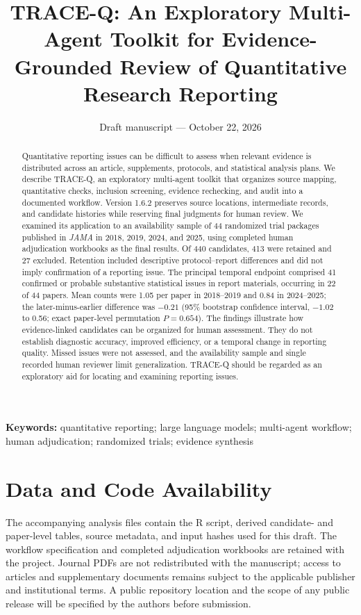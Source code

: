 \documentclass[11pt,a4paper]{article}
\title{\textbf{TRACE-Q: An Exploratory Multi-Agent Toolkit for Evidence-Grounded Review of Quantitative Research Reporting}}
\author{}
\date{Draft manuscript --- October 22, 2026}
\begin{document}
\maketitle
\begin{abstract}
Quantitative reporting issues can be difficult to assess when relevant evidence is distributed across an article, supplements, protocols, and statistical analysis plans. We describe TRACE-Q, an exploratory multi-agent toolkit that organizes source mapping, quantitative checks, inclusion screening, evidence rechecking, and audit into a documented workflow. Version 1.6.2 preserves source locations, intermediate records, and candidate histories while reserving final judgments for human review. We examined its application to an availability sample of 44 randomized trial packages published in \textit{JAMA} in 2018, 2019, 2024, and 2025, using completed human adjudication workbooks as the final results. Of 440 candidates, 413 were retained and 27 excluded. Retention included descriptive protocol--report differences and did not imply confirmation of a reporting issue. The principal temporal endpoint comprised 41 confirmed or probable substantive statistical issues in report materials, occurring in 22 of 44 papers. Mean counts were 1.05 per paper in 2018--2019 and 0.84 in 2024--2025; the later-minus-earlier difference was $-0.21$ (95\% bootstrap confidence interval, $-1.02$ to 0.56; exact paper-level permutation $P=0.654$). The findings illustrate how evidence-linked candidates can be organized for human assessment. They do not establish diagnostic accuracy, improved efficiency, or a temporal change in reporting quality. Missed issues were not assessed, and the availability sample and single recorded human reviewer limit generalization. TRACE-Q should be regarded as an exploratory aid for locating and examining reporting issues.
\end{abstract}
\noindent\textbf{Keywords:} quantitative reporting; large language models; multi-agent workflow; human adjudication; randomized trials; evidence synthesis






\clearpage


\section*{Data and Code Availability}
The accompanying analysis files contain the R script, derived candidate- and paper-level tables, source metadata, and input hashes used for this draft. The workflow specification and completed adjudication workbooks are retained with the project. Journal PDFs are not redistributed with the manuscript; access to articles and supplementary documents remains subject to the applicable publisher and institutional terms. A public repository location and the scope of any public release will be specified by the authors before submission.
\end{document}
